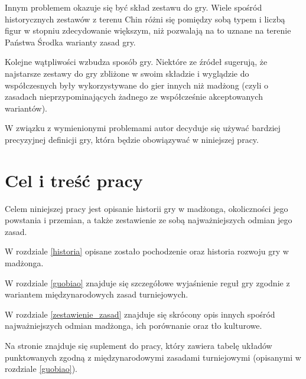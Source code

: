 Innym problemem okazuje się być skład zestawu do gry. Wiele spośród
historycznych zestawów z terenu Chin różni się pomiędzy sobą typem i liczbą
figur w stopniu zdecydowanie większym, niż pozwalają na to uznane na terenie
Państwa Środka warianty zasad gry.

Kolejne wątpliwości wzbudza sposób gry. Niektóre ze źródeł sugerują, że
najstarsze zestawy do gry zbliżone w swoim składzie i wyglądzie do współczesnych
były wykorzystywane do gier innych niż madżong (czyli o zasadach
nieprzypominających żadnego ze współcześnie akceptowanych wariantów).

W związku z wymienionymi problemami autor decyduje się używać bardziej
precyzyjnej definicji gry, %
która będzie obowiązywać w niniejszej pracy.



\section{Cel i treść pracy}
Celem niniejszej pracy jest opisanie historii gry w madżonga, okoliczności jego
powstania i przemian, a także zestawienie ze sobą najważniejszych odmian jego
zasad.

W rozdziale \ref{historia} opisane zostało pochodzenie oraz historia rozwoju gry
w madżonga.

W rozdziale \ref{guobiao} znajduje się szczegółowe wyjaśnienie reguł gry zgodnie
z wariantem międzynarodowych zasad turniejowych.

W rozdziale \ref{zestawienie_zasad} znajduje się skrócony opis innych spośród
najważniejszych odmian madżonga, ich porównanie oraz tło kulturowe.

Na stronie \pageref{suplement} znajduje się suplement do pracy, który zawiera
tabelę układów punktowanych zgodną z międzynarodowymi zasadami turniejowymi
(opisanymi w rozdziale \ref{guobiao}).

